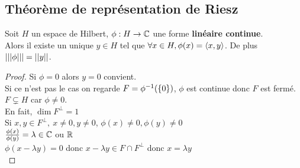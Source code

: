 \subsection{Théorème de représentation de Riesz}

\begin{theorem}
	Soit $H$ un espace de Hilbert, $\phi : H \to \mathbb{C}$ une forme \textbf{linéaire continue}.\\
	Alors il existe un unique $y \in H$ tel que $\forall x \in H, \phi(x) = \left\langle x, y \right\rangle$.
	De plus $\left|\left|\left|\phi\right|\right|\right| = \left|\left|y\right|\right|$.
\end{theorem}


\begin{proof}
	Si $\phi = 0$ alors $y = 0$ convient.\\
	Si ce n'est pas le cas on regarde $F = \phi^{-1}(\left\{0\right\})$, $\phi$ est continue donc $F$ est fermé.\\
	$F \subsetneq H$ car $\phi \neq 0$.\\
	En fait, $\dim F^\perp = 1$\\
	Si $x,y \in F^\perp,\ x \neq 0, y \neq 0$, 	$\phi(x) \neq 0, \phi(y) \neq 0$\\
	$\frac {\phi(x)} {\phi(y)} = \lambda \in \mathbb{C}$ ou $\mathbb{R}$\\
	$\phi(x-\lambda y) = 0$ donc $x - \lambda y \in F \cap F^\perp$ donc $x = \lambda y$\\
\end{proof}


